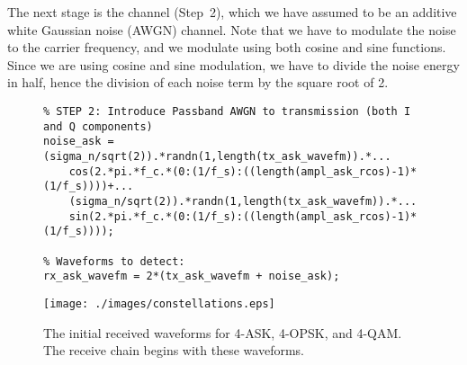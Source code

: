 \documentclass[letterpaper,12pt]{article}
\begin{document}
The next stage is the channel (Step~2), which we have assumed to be an additive white Gaussian noise (AWGN) channel. Note that we have to modulate the noise to the carrier frequency, and we modulate using both cosine and sine functions. Since we are using cosine and sine modulation, we have to divide the noise energy in half, hence the division of each noise term by the square root of 2.
\begin{figure}[h]
\centering
\begin{minipage}[framed]{0.9\textwidth}
\begin{lstlisting}
% STEP 2: Introduce Passband AWGN to transmission (both I and Q components)
noise_ask = (sigma_n/sqrt(2)).*randn(1,length(tx_ask_wavefm)).*...
    cos(2.*pi.*f_c.*(0:(1/f_s):((length(ampl_ask_rcos)-1)*(1/f_s))))+...
    (sigma_n/sqrt(2)).*randn(1,length(tx_ask_wavefm)).*...
    sin(2.*pi.*f_c.*(0:(1/f_s):((length(ampl_ask_rcos)-1)*(1/f_s))));
    
% Waveforms to detect:
rx_ask_wavefm = 2*(tx_ask_wavefm + noise_ask);
\end{lstlisting}
\end{minipage}
\captionsetup{labelformat=empty}
\end{figure}

\begin{figure}[h]
 \centering
 \texttt{[image: ./images/constellations.eps]}
 \caption{The initial received waveforms for 4-ASK, 4-OPSK, and 4-QAM. The receive chain begins with these waveforms.}
\label{fig:rx}
\end{figure}
\end{document}
